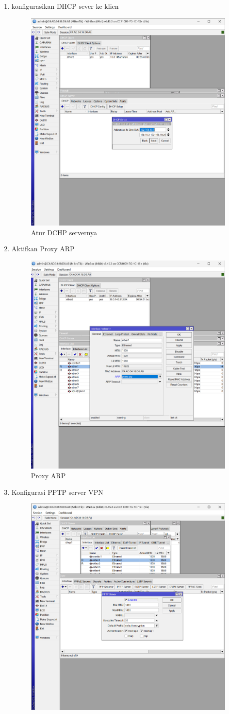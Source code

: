 \begin{enumerate}
\begin{figure}[H]
        \caption{Konfigurasi alamat lokal}
        \label{fig:gambar4}
    \end{figure}
    \item konfigurasikan DHCP sever ke klien
     \begin{figure}[H]
        \centering
        \includegraphics[width=0.5\linewidth]{P1/img/5.png}
        \caption{Atur DCHP servernya}
        \label{fig:gambar4}
    \end{figure}
    \item Aktifkan Proxy ARP
     \begin{figure}[H]
        \centering
        \includegraphics[width=0.5\linewidth]{P1/img/6.png}
        \caption{Proxy ARP}
        \label{fig:gambar4}
    \end{figure}
    \item Konfigurasi PPTP server VPN
     \begin{figure}[H]
        \centering
        \includegraphics[width=0.5\linewidth]{P1/img/7.png}

\end{figure}
\end{enumerate}
